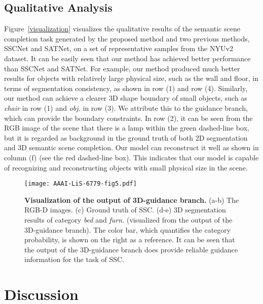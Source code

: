 \documentclass[letterpaper]{article} \usepackage{aaai20}  \usepackage{times}  \usepackage{helvet} \usepackage{courier}  \usepackage[hyphens]{url}  \usepackage{graphicx} \urlstyle{rm} \def\UrlFont{\rm}  \usepackage{graphicx}  \frenchspacing  \setlength{\pdfpagewidth}{8.5in}  \setlength{\pdfpageheight}{11in}
\begin{document}
\subsection{Qualitative Analysis}
Figure~\ref{visualization} visualizes the qualitative results of the semantic scene completion task generated by the proposed method and two previous methods, SSCNet and SATNet, on a set of representative samples from the NYUv2 dataset.
It can be easily seen that our method has achieved better performance than SSCNet and SATNet. For example, our method produced much better results for objects with relatively large physical size, such as the wall and floor, in terms of segmentation consistency, as shown in row (1) and row (4). Similarly, our method can achieve a clearer 3D shape boundary of small objects, such as \emph{chair} in row (1) and \emph{obj.} in row (3). We attribute this to the guidance branch, which can provide the boundary constraints. In row (2), it can be seen from the RGB image of the scene that there is a lamp within the green dashed-line box, but it is regarded as background in the ground truth of both 2D segmentation and 3D semantic scene completion. Our model can reconstruct it well as shown in column (f) (see the red dashed-line box). This indicates that our model is capable of recognizing and reconstructing objects with small physical size in the scene.


\begin{figure*}[t]
\centering
\texttt{[image: AAAI-LiS-6779-fig5.pdf]}
\caption{\textbf{Visualization of the output of 3D-guidance branch.} (a-b) The RGB-D images. (c) Ground truth of SSC. (d-e) 3D segmentation results of category \emph{bed} and \emph{furn.} (visualized from the output of the 3D-guidance branch). The color bar, which quantifies the category probability, is shown on the right as a reference. It can be seen that the output of the 3D-guidance branch does provide reliable guidance information for the task of SSC.}
\label{segbranch}
\end{figure*}



\section{Discussion}
\end{document}
